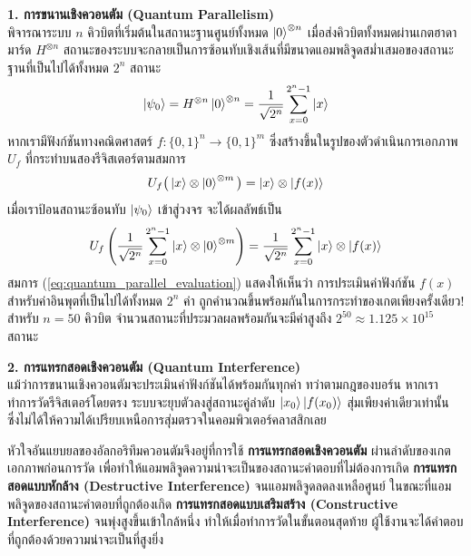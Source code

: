 \noindent\textbf{1. การขนานเชิงควอนตัม (Quantum Parallelism)} \\
พิจารณาระบบ $n$ คิวบิตที่เริ่มต้นในสถานะฐานศูนย์ทั้งหมด $\ket{0}^{\otimes n}$ เมื่อส่งคิวบิตทั้งหมดผ่านเกตฮาดามาร์ด $H^{\otimes n}$ สถานะของระบบจะกลายเป็นการซ้อนทับเชิงเส้นที่มีขนาดแอมพลิจูดสม่ำเสมอของสถานะฐานที่เป็นไปได้ทั้งหมด $2^n$ สถานะ
\begin{equation}
\ket{\psi_0} = H^{\otimes n} \ket{0}^{\otimes n} = \frac{1}{\sqrt{2^n}} \sum_{x=0}^{2^n-1} \ket{x}
\label{eq:hadamard_uniform_superposition}
\end{equation}
หากเรามีฟังก์ชันทางคณิตศาสตร์ $f: \{0, 1\}^n \to \{0, 1\}^m$ ซึ่งสร้างขึ้นในรูปของตัวดำเนินการเอกภาพ $U_f$ ที่กระทำบนสองรีจิสเตอร์ตามสมการ
\begin{equation}
U_f \big( \ket{x} \otimes \ket{0}^{\otimes m} \big) = \ket{x} \otimes \ket{f(x)}
\end{equation}
เมื่อเราป้อนสถานะซ้อนทับ $\ket{\psi_0}$ เข้าสู่วงจร จะได้ผลลัพธ์เป็น
\begin{equation}
U_f \left( \frac{1}{\sqrt{2^n}} \sum_{x=0}^{2^n-1} \ket{x} \otimes \ket{0}^{\otimes m} \right) = \frac{1}{\sqrt{2^n}} \sum_{x=0}^{2^n-1} \ket{x} \otimes \ket{f(x)}
\label{eq:quantum_parallel_evaluation}
\end{equation}
สมการ (\ref{eq:quantum_parallel_evaluation}) แสดงให้เห็นว่า การประเมินค่าฟังก์ชัน $f(x)$ สำหรับค่าอินพุตที่เป็นไปได้ทั้งหมด $2^n$ ค่า ถูกคำนวณขึ้นพร้อมกันในการกระทำของเกตเพียงครั้งเดียว! สำหรับ $n = 50$ คิวบิต จำนวนสถานะที่ประมวลผลพร้อมกันจะมีค่าสูงถึง $2^{50} \approx 1.125 \times 10^{15}$ สถานะ

\noindent\textbf{2. การแทรกสอดเชิงควอนตัม (Quantum Interference)} \\
แม้ว่าการขนานเชิงควอนตัมจะประเมินค่าฟังก์ชันได้พร้อมกันทุกค่า ทว่าตามกฎของบอร์น หากเราทำการวัดรีจิสเตอร์โดยตรง ระบบจะยุบตัวลงสู่สถานะคู่ลำดับ $\ket{x_0}\ket{f(x_0)}$ สุ่มเพียงค่าเดียวเท่านั้น ซึ่งไม่ได้ให้ความได้เปรียบเหนือการสุ่มตรวจในคอมพิวเตอร์คลาสสิกเลย

หัวใจอันแยบยลของอัลกอริทึมควอนตัมจึงอยู่ที่การใช้ \textbf{การแทรกสอดเชิงควอนตัม} ผ่านลำดับของเกตเอกภาพก่อนการวัด เพื่อทำให้แอมพลิจูดความน่าจะเป็นของสถานะคำตอบที่ไม่ต้องการเกิด \textbf{การแทรกสอดแบบหักล้าง (Destructive Interference)} จนแอมพลิจูดลดลงเหลือศูนย์ ในขณะที่แอมพลิจูดของสถานะคำตอบที่ถูกต้องเกิด \textbf{การแทรกสอดแบบเสริมสร้าง (Constructive Interference)} จนพุ่งสูงขึ้นเข้าใกล้หนึ่ง ทำให้เมื่อทำการวัดในขั้นตอนสุดท้าย ผู้ใช้งานจะได้คำตอบที่ถูกต้องด้วยความน่าจะเป็นที่สูงยิ่ง

